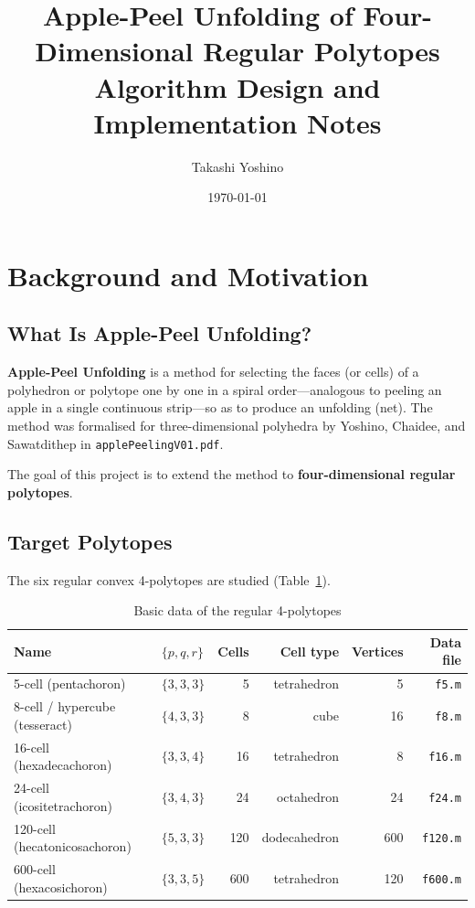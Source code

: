 \documentclass[12pt,a4paper]{article}
\title{\textbf{Apple-Peel Unfolding of Four-Dimensional Regular Polytopes}\\[0.4em]
  \large Algorithm Design and Implementation Notes}
\author{Takashi Yoshino}
\date{\today}
\theoremstyle{definition}
\begin{document}
\maketitle
\tableofcontents
\bigskip


\section{Background and Motivation}

\subsection{What Is Apple-Peel Unfolding?}

\textbf{Apple-Peel Unfolding} is a method for selecting the faces (or cells) of a
polyhedron or polytope one by one in a spiral order---analogous to peeling an
apple in a single continuous strip---so as to produce an unfolding (net).
The method was formalised for three-dimensional polyhedra by
Yoshino, Chaidee, and Sawatdithep in \texttt{applePeelingV01.pdf}.

The goal of this project is to extend the method to
\textbf{four-dimensional regular polytopes}.

\subsection{Target Polytopes}

The six regular convex 4-polytopes are studied (Table~\ref{tab:polytopes}).

\begin{table}[h]
\centering
\caption{Basic data of the regular 4-polytopes}
\label{tab:polytopes}
\small
\begin{tabular}{llrrrr}
\toprule
Name & $\{p,q,r\}$ & Cells & Cell type & Vertices & Data file \\
\midrule
5-cell (pentachoron)            & $\{3,3,3\}$ &   5 & tetrahedron      &   5 & \texttt{f5.m}  \\
8-cell / hypercube (tesseract)  & $\{4,3,3\}$ &   8 & cube             &  16 & \texttt{f8.m}  \\
16-cell (hexadecachoron)        & $\{3,3,4\}$ &  16 & tetrahedron      &   8 & \texttt{f16.m} \\
24-cell (icositetrachoron)      & $\{3,4,3\}$ &  24 & octahedron       &  24 & \texttt{f24.m} \\
120-cell (hecatonicosachoron)   & $\{5,3,3\}$ & 120 & dodecahedron     & 600 & \texttt{f120.m}\\
600-cell (hexacosichoron)       & $\{3,3,5\}$ & 600 & tetrahedron      & 120 & \texttt{f600.m}\\
\bottomrule
\end{tabular}
\end{table}
\end{document}
